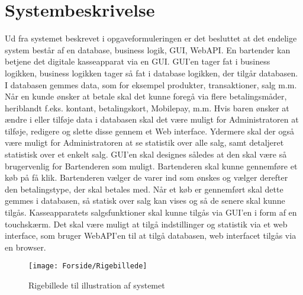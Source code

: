 \chapter{Systembeskrivelse}

Ud fra systemet beskrevet i opgaveformuleringen er det besluttet at det endelige system består af en database, business logik, \gls{GUI}, \gls{WebAPI}. 
\newline\newline
En bartender kan betjene det digitale kasseapparat via en \gls{GUI}. \gls{GUI}'en tager fat i business logikken, business logikken tager så fat i database logikken, der tilgår databasen. I databasen gemmes data, som for eksempel produkter, transaktioner, salg m.m.
Når en kunde ønsker at betale skal det kunne foregå via flere betalingsmåder, heriblandt f.eks. kontant, betalingskort, Mobilepay, m.m.
\newline\newline
Hvis baren ønsker at ændre i eller tilføje data i databasen skal det være muligt for Administratoren at tilføje, redigere og slette disse gennem et Web interface. Ydermere skal der også være muligt for Administratoren at se statistik over alle salg, samt detaljeret statistisk over et enkelt salg. 
\newline\newline
GUI'en skal designes således at den skal være så brugervenlig for Bartenderen som muligt. Bartenderen skal kunne gennemføre et køb på få klik. Bartenderen vælger de varer ind som ønskes og vælger derefter den betalingstype, der skal betales med. Når et køb er gennemført skal dette gemmes i databasen, så statisk over salg kan vises og så de senere skal kunne tilgås. 
\newline\newline
Kasseapparatets salgsfunktioner skal kunne tilgås via \gls{GUI}'en i form af en touchskærm. Det skal være muligt at tilgå indstillinger og statistik via et web interface, som bruger \gls{WebAPI}'en til at tilgå databasen, web interfacet tilgås via en browser. 
                  
\begin{figure}[h]
    \centering
    \texttt{[image: Forside/Rigebillede]}
    \caption{Rigebillede til illustration af systemet}
    \label{fig:rig_billede}
\end{figure}